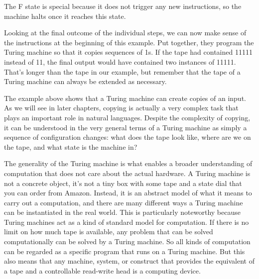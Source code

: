 \begin{examplebox}
\begin{center}





    \end{center}
    The F state is special because it does not trigger any new instructions, so the machine halts once it reaches this state.

    Looking at the final outcome of the individual steps, we can now make sense of the instructions at the beginning of this example.
    Put together, they program the Turing machine so that it copies sequences of 1s.
    If the tape had contained 11111 instead of 11, the final output would have contained two instances of 11111.
    That's longer than the tape in our example, but remember that the tape of a Turing machine can always be extended as necessary.
    \label{ex:Formal_turingmachine}
\end{examplebox}

The example above shows that a Turing machine can create copies of an input.
As we will see in later chapters, copying is actually a very complex task that plays an important role in natural languages.
Despite the complexity of copying, it can be understood in the very general terms of a Turing machine as simply a sequence of configuration changes: what does the tape look like, where are we on the tape, and what state is the machine in?

The generality of the Turing machine is what enables a broader understanding of computation that does not care about the actual hardware.
A Turing machine is not a concrete object, it's not a tiny box with some tape and a state dial that you can order from Amazon.
Instead, it is an abstract model of what it means to carry out a computation, and there are many different ways a Turing machine can be instantiated in the real world.
This is particularly noteworthy because Turing machines act as a kind of standard model for computation.
If there is no limit on how much tape is available, any problem that can be solved computationally can be solved by a Turing machine.
So all kinds of computation can be regarded as a specific program that runs on a Turing machine.
But this also means that any machine, system, or construct that provides the equivalent of a tape and a controllable read-write head is a computing device.

